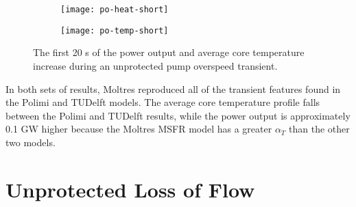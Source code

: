 \begin{figure}[htbp!]
    \centering
    \begin{subfigure}[t]{.485\textwidth}
        \centering
        \texttt{[image: po-heat-short]}
    \end{subfigure}
    \hfill
    \begin{subfigure}[t]{.485\textwidth}
        \centering
        \texttt{[image: po-temp-short]}
    \end{subfigure}
    \caption{The first 20 s of the power output and average core temperature
    increase during an unprotected pump overspeed transient.}
    \label{fig:poshort}
\end{figure}

In both sets of results, Moltres reproduced all of the transient features
found in the Polimi and TUDelft models. The average core temperature profile
falls between the Polimi and TUDelft results, while the power output is
approximately 0.1 GW higher because the Moltres \gls{MSFR} model has a
greater $\alpha_T$ than the other two models. 

\section{Unprotected Loss of Flow}

